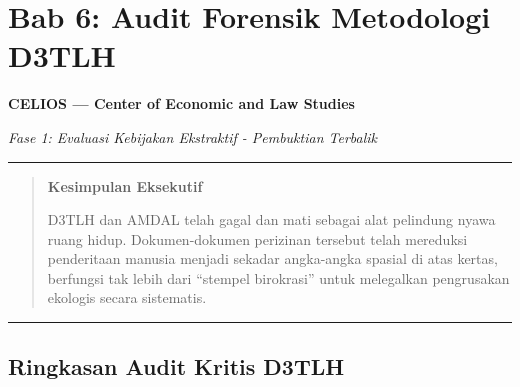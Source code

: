 \documentclass[
]{article}
\author{}
\date{}
\begin{document}
\section{Bab 6: Audit Forensik Metodologi
D3TLH}\label{bab-6-audit-forensik-metodologi-d3tlh}

\textbf{CELIOS --- Center of Economic and Law Studies}

\emph{Fase 1: Evaluasi Kebijakan Ekstraktif - Pembuktian Terbalik}

\begin{center}\rule{0.5\linewidth}{0.5pt}\end{center}

\begin{quote}
\textbf{Kesimpulan Eksekutif}

D3TLH dan AMDAL telah gagal dan mati sebagai alat pelindung nyawa ruang
hidup. Dokumen-dokumen perizinan tersebut telah mereduksi penderitaan
manusia menjadi sekadar angka-angka spasial di atas kertas, berfungsi
tak lebih dari ``stempel birokrasi'' untuk melegalkan pengrusakan
ekologis secara sistematis.
\end{quote}

\begin{center}\rule{0.5\linewidth}{0.5pt}\end{center}

\subsection{Ringkasan Audit Kritis
D3TLH}\label{ringkasan-audit-kritis-d3tlh}
\end{document}
